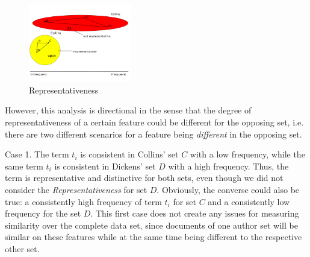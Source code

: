 \documentclass[a4paper,10pt,twoside,fleqn]{article}
\begin{document}
\begin{figure}
  \caption{Representativeness}
 \begin{center}
  \includegraphics[width=0.4\textwidth]{figures/repres1-fin.png}
  \end{center}
 \end{figure}

However, this analysis is directional in the sense that the degree
of representativeness of a certain feature could be different
for the opposing set, i.e. there are two different scenarios
for a feature being \emph{different} in the opposing set.

Case 1. The term $t_i$ is consistent in Collins' set $C$ with a low
frequency, while the same term $t_i$ is consistent in Dickens' set $D$
with a high frequency.
Thus, the term is representative and distinctive for both sets,
even though we did not consider the \emph{Representativeness} for set $D$.
Obviously, the converse could also be true: a consistently high frequency
of term $t_i$ for set $C$ and a consistently low frequency for the set $D$.
This first case does not create any issues for measuring similarity over the
complete data set, since documents of one author set will be similar on
these features while at the same time being different to the respective other set.
\end{document}
